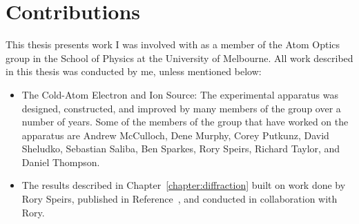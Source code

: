 \chapter*{Contributions}

This thesis presents work I was involved with as a member of the Atom Optics group in the School of Physics at the University of Melbourne.
All work described in this thesis was conducted by me, unless mentioned below:
\begin{itemize}
\item The Cold-Atom Electron and Ion Source: The experimental apparatus was designed, constructed, and improved by many members of the group over a number of years.
Some of the members of the group that have worked on the apparatus are
Andrew McCulloch, Dene Murphy, Corey Putkunz, David Sheludko, Sebastian Saliba, Ben Sparkes, Rory Speirs, Richard Taylor, and Daniel Thompson.
\item The results described in Chapter~\ref{chapter:diffraction} built on work done by Rory Speirs, published in Reference~\cite{speirs_single-shot_2015}, and conducted in collaboration with Rory.
\end{itemize}
